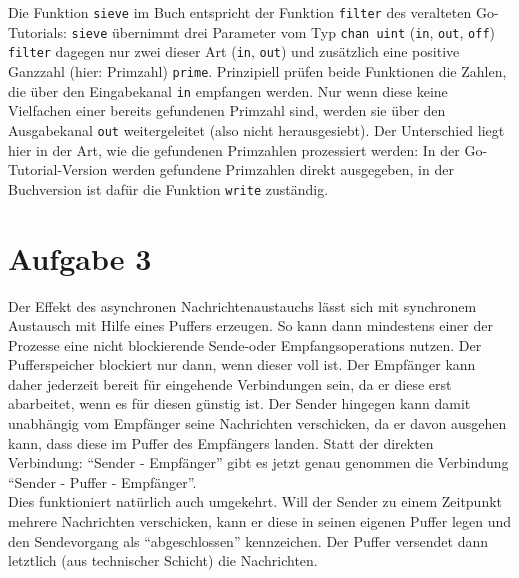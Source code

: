 \documentclass[11pt,a4paper,DIV=10,]{scrartcl}
\begin{document}
Die Funktion \texttt{sieve} im Buch entspricht der Funktion \texttt{filter} des veralteten Go-Tutorials: \texttt{sieve} übernimmt drei Parameter vom Typ \texttt{chan uint} (\texttt{in}, \texttt{out}, \texttt{off}) \texttt{filter} dagegen nur zwei dieser Art (\texttt{in}, \texttt{out}) und zusätzlich eine positive Ganzzahl (hier: Primzahl) \texttt{prime}. Prinzipiell prüfen beide Funktionen die Zahlen, die über den Ein\-gabe\-ka\-nal \texttt{in} empfangen werden. Nur wenn diese keine Vielfachen einer bereits gefundenen Primzahl sind, werden sie über den Ausgabekanal \texttt{out} weitergeleitet (also nicht herausgesiebt). Der Unterschied liegt hier in der Art,  wie die gefundenen Primzahlen prozessiert werden: In der Go-Tutorial-Version werden gefundene Primzahlen direkt ausgegeben, in der Buchversion ist dafür die Funktion \texttt{write} zuständig.

\section*{Aufgabe 3}
Der Effekt des asynchronen Nachrichtenaustauchs lässt sich mit synchronem Austausch mit Hilfe eines Puffers erzeugen. So kann dann mindestens einer der Prozesse eine nicht blockierende Sende-oder Empfangsoperations nutzen. Der Pufferspeicher blockiert nur dann, wenn dieser voll ist. Der Empfänger kann daher jederzeit bereit für eingehende Verbindungen sein, da er diese erst abarbeitet, wenn es für diesen günstig ist. Der Sender hingegen kann damit unabhängig vom Empfänger seine Nachrichten verschicken, da er davon ausgehen kann, dass diese im Puffer des Empfängers landen. 
Statt der direkten Verbindung: ``Sender - Empfänger'' gibt es jetzt genau genommen die Verbindung ``Sender - Puffer - Empfänger''.  \\
Dies funktioniert natürlich auch umgekehrt. Will der Sender zu einem Zeitpunkt mehrere Nachrichten verschicken, kann er diese in seinen eigenen Puffer legen und den Sendevorgang als ``abgeschlossen'' kennzeichen. Der Puffer versendet dann letztlich (aus technischer Schicht) die Nachrichten. 
\end{document}
